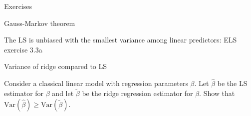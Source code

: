 \documentclass[
  ignorenonframetext,
]{beamer}
\begin{document}
\begin{frame}{Exercises}
\protect\hypertarget{exercises}{}

\begin{block}{Gauss-Markov theorem}

The LS is unbiased with the smallest variance among linear predictors:
ELS exercise 3.3a

\end{block}

\begin{block}{Variance of ridge compared to LS}

Consider a classical linear model with regression parameters \(\beta\).
Let \(\hat{\beta}\) be the LS estimator for \(\beta\) and let
\(\tilde{\beta}\) be the ridge regression estimator for \(\beta\). Show
that \(\text{Var}(\hat{\beta}) \ge \text{Var}(\tilde{\beta})\).

\end{block}

\end{frame}
\end{document}

